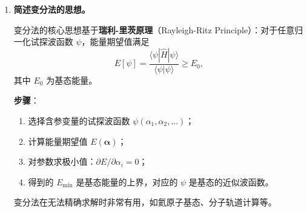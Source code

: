 \begin{enumerate}[label=\textbf{\arabic*.}, leftmargin=2em, itemsep=0.8em]
\item \textbf{简述变分法的思想。}

变分法的核心思想基于\textbf{瑞利-里茨原理}（Rayleigh-Ritz Principle）：对于任意归一化试探波函数 $\psi$，能量期望值满足
\[
    E[\psi] = \frac{\langle\psi|\hat{H}|\psi\rangle}{\langle\psi|\psi\rangle} \ge E_0,
\]
其中 $E_0$ 为基态能量。

\textbf{步骤}：
\begin{enumerate}[nosep, label=(\arabic*)]
    \item 选择含参变量的试探波函数 $\psi(\alpha_1, \alpha_2, \dots)$；
    \item 计算能量期望值 $E(\boldsymbol{\alpha})$；
    \item 对参数求极小值：$\partial E/\partial\alpha_i = 0$；
    \item 得到的 $E_{\min}$ 是基态能量的上界，对应的 $\psi$ 是基态的近似波函数。
\end{enumerate}
变分法在无法精确求解时非常有用，如氦原子基态、分子轨道计算等。

\end{enumerate}

